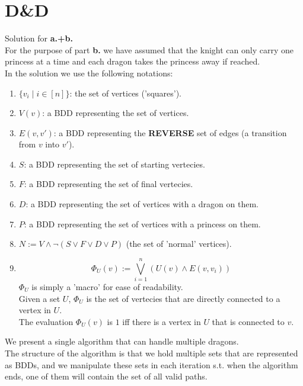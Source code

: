 \documentclass{article}
\begin{document}

\section{D\&D}
Solution for \textbf{a.+b.}\\
For the purpose of part \textbf{b.} we have assumed 
that the knight can only carry one princess at a time
and each dragon takes the princess away if reached.\\

In the solution we use the following notations:
\begin{enumerate}[label=\textbf{\arabic*.}]
    \item $\{v_i\mid i\in[n]\}$: the set of vertices ('squares').
    \item $V(v)$: a BDD representing the set of vertices.
    \item $E(v,v')$: a BDD representing the \textbf{REVERSE} set of edges (a transition from $v$ into $v'$).
    \item $S$: a BDD representing the set of starting vertecies.
    \item $F$: a BDD representing the set of final vertecies.
    \item $D$: a BDD representing the set of vertices with a dragon on them.
    \item $P$: a BDD representing the set of vertices with a princess on them.
    \item $N:=V\wedge\neg(S\vee F\vee D\vee P)$ (the set of 'normal' vertices).
    \item \[\Phi_U(v):=\bigvee_{i=1}^n(U(v)\wedge E(v,v_i))\]
        $\Phi_U$ is simply a 'macro' for ease of readability.\\
        Given a set $U$, $\Phi_U$ is the set of vertecies that are directly connected to a vertex in $U$.\\
        The evaluation $\Phi_U(v)$ is $1$ iff there is a vertex in $U$ that is connected to $v$.
\end{enumerate}

We present a single algorithm that can handle multiple dragons.\\
The structure of the algorithm is that we hold
multiple sets that are represented as BDDs, and we manipulate
these sets in each iteration s.t. when the algorithm ends,
one of them will contain the set of all valid paths.\\
\end{document}

